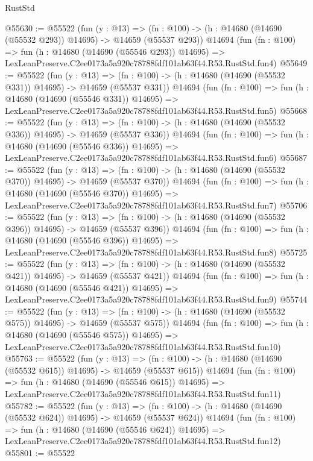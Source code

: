 \begin{lexlean}{RustStd}
\begin{coremodule}
@55630 := @55522
    (fun (y : @13) =>
    (fn : @100) -> (h : @14680 (@14690 (@55532 @293)) @14695) -> @14659 (@55537 @293))
    @14694
    (fun (fn : @100) =>
    fun (h : @14680 (@14690 (@55546 @293)) @14695) =>
    LexLeanPreserve.C2ee0173a5a920c78788fdf101ab63f44.R53.RustStd.fun4)
@55649 := @55522
    (fun (y : @13) =>
    (fn : @100) -> (h : @14680 (@14690 (@55532 @331)) @14695) -> @14659 (@55537 @331))
    @14694
    (fun (fn : @100) =>
    fun (h : @14680 (@14690 (@55546 @331)) @14695) =>
    LexLeanPreserve.C2ee0173a5a920c78788fdf101ab63f44.R53.RustStd.fun5)
@55668 := @55522
    (fun (y : @13) =>
    (fn : @100) -> (h : @14680 (@14690 (@55532 @336)) @14695) -> @14659 (@55537 @336))
    @14694
    (fun (fn : @100) =>
    fun (h : @14680 (@14690 (@55546 @336)) @14695) =>
    LexLeanPreserve.C2ee0173a5a920c78788fdf101ab63f44.R53.RustStd.fun6)
@55687 := @55522
    (fun (y : @13) =>
    (fn : @100) -> (h : @14680 (@14690 (@55532 @370)) @14695) -> @14659 (@55537 @370))
    @14694
    (fun (fn : @100) =>
    fun (h : @14680 (@14690 (@55546 @370)) @14695) =>
    LexLeanPreserve.C2ee0173a5a920c78788fdf101ab63f44.R53.RustStd.fun7)
@55706 := @55522
    (fun (y : @13) =>
    (fn : @100) -> (h : @14680 (@14690 (@55532 @396)) @14695) -> @14659 (@55537 @396))
    @14694
    (fun (fn : @100) =>
    fun (h : @14680 (@14690 (@55546 @396)) @14695) =>
    LexLeanPreserve.C2ee0173a5a920c78788fdf101ab63f44.R53.RustStd.fun8)
@55725 := @55522
    (fun (y : @13) =>
    (fn : @100) -> (h : @14680 (@14690 (@55532 @421)) @14695) -> @14659 (@55537 @421))
    @14694
    (fun (fn : @100) =>
    fun (h : @14680 (@14690 (@55546 @421)) @14695) =>
    LexLeanPreserve.C2ee0173a5a920c78788fdf101ab63f44.R53.RustStd.fun9)
@55744 := @55522
    (fun (y : @13) =>
    (fn : @100) -> (h : @14680 (@14690 (@55532 @575)) @14695) -> @14659 (@55537 @575))
    @14694
    (fun (fn : @100) =>
    fun (h : @14680 (@14690 (@55546 @575)) @14695) =>
    LexLeanPreserve.C2ee0173a5a920c78788fdf101ab63f44.R53.RustStd.fun10)
@55763 := @55522
    (fun (y : @13) =>
    (fn : @100) -> (h : @14680 (@14690 (@55532 @615)) @14695) -> @14659 (@55537 @615))
    @14694
    (fun (fn : @100) =>
    fun (h : @14680 (@14690 (@55546 @615)) @14695) =>
    LexLeanPreserve.C2ee0173a5a920c78788fdf101ab63f44.R53.RustStd.fun11)
@55782 := @55522
    (fun (y : @13) =>
    (fn : @100) -> (h : @14680 (@14690 (@55532 @624)) @14695) -> @14659 (@55537 @624))
    @14694
    (fun (fn : @100) =>
    fun (h : @14680 (@14690 (@55546 @624)) @14695) =>
    LexLeanPreserve.C2ee0173a5a920c78788fdf101ab63f44.R53.RustStd.fun12)
@55801 := @55522

\end{coremodule}
\end{lexlean}

